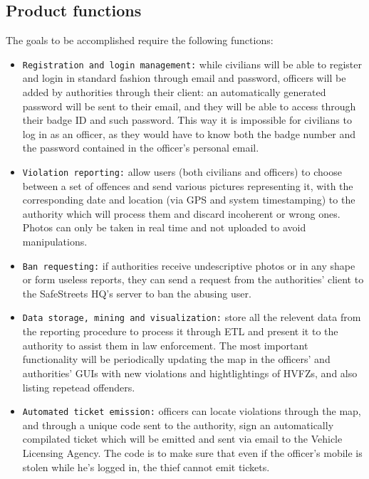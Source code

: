 \documentclass[12pt,a4paper]{article}
\begin{document}
\subsection{Product	functions}
The goals to be accomplished require the following functions:
 \begin{itemize}
\item \texttt{Registration and login management:} while civilians will be able to register and login in standard fashion through email and password, officers will be added by authorities through their client: an automatically generated password will be sent to their email, and they will be able to access through their badge ID and such password. This way it is impossible for civilians to log in as an officer, as they would have to know both the badge number and the password contained in the officer's personal email.

\item \texttt{Violation reporting:} allow users (both civilians and officers) to choose between a set of offences and send various pictures representing it, with the corresponding date and location (via GPS and system timestamping) to the authority which will process them and discard incoherent or wrong ones. Photos can only be taken in real time and not uploaded to avoid manipulations.

\item \texttt{Ban requesting:} if authorities receive undescriptive photos or in any shape or form useless reports, they can send a request from the authorities' client to the SafeStreets HQ's server to ban the abusing user.

\item  \texttt{Data storage, mining and visualization:} store all the relevent data from the reporting procedure to process it through ETL and present it to the authority to assist them in law enforcement. The most important functionality will be periodically updating the map in the officers' and authorities' GUIs with new violations and hightlightings of HVFZs, and also listing repetead offenders. 

\item  \texttt{Automated ticket emission:} officers can locate violations through the map, and through a unique code sent to the authority, sign an automatically compilated ticket which will be emitted and sent via email to the Vehicle Licensing Agency. The code is to make sure that even if the officer's mobile is stolen while he's logged in, the thief cannot emit tickets.
\end{itemize}
\newpage
\end{document}
